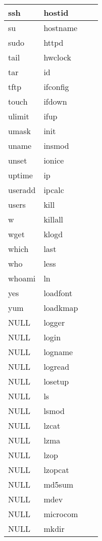 \begin{longtable}{llp{60mm}p{60mm}}
     \hline
     ssh & hostid \\
     \hline
     su & hostname \\
     \hline
     sudo & httpd \\
     \hline
     tail & hwclock \\
     \hline
     tar & id \\
     \hline
     tftp & ifconfig \\
     \hline
     touch & ifdown \\
     \hline
     ulimit & ifup \\
     \hline
     umask & init \\
     \hline
     uname & insmod \\
     \hline
     unset & ionice \\
     \hline
     uptime & ip \\
     \hline
     useradd & ipcalc \\
     \hline
     users & kill \\
     \hline
     w & killall \\
     \hline
     wget & klogd \\
     \hline
     which & last \\
     \hline
     who & less \\
     \hline
     whoami & ln \\
     \hline
     yes & loadfont \\
     \hline
     yum & loadkmap \\
     \hline
      NULL& logger \\
     \hline
      NULL& login \\
     \hline
      NULL& logname \\
     \hline
      NULL& logread \\
     \hline
      NULL& losetup \\
     \hline
      NULL& ls \\
     \hline
      NULL& lsmod \\
     \hline
      NULL& lzcat \\
     \hline
      NULL& lzma \\
     \hline
      NULL& lzop \\
     \hline
      NULL& lzopcat \\
     \hline
      NULL& md5sum \\
     \hline
      NULL& mdev \\
     \hline
      NULL& microcom \\
     \hline
      NULL& mkdir \\

\end{longtable}
